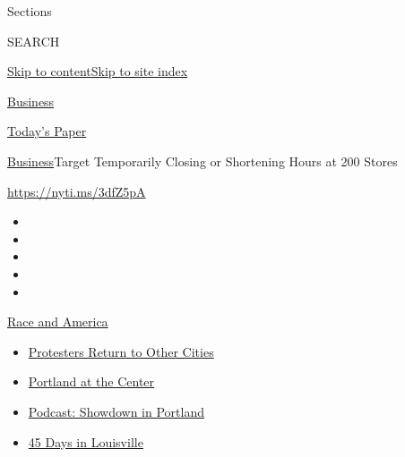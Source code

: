 Sections

SEARCH

\protect\hyperlink{site-content}{Skip to
content}\protect\hyperlink{site-index}{Skip to site index}

\href{https://www.nytimes.com/section/business}{Business}

\href{https://myaccount.nytimes.com/auth/login?response_type=cookie\&client_id=vi}{}

\href{https://www.nytimes.com/section/todayspaper}{Today's Paper}

\href{/section/business}{Business}\textbar{}Target Temporarily Closing
or Shortening Hours at 200 Stores

\url{https://nyti.ms/3dfZ5pA}

\begin{itemize}
\item
\item
\item
\item
\item
\end{itemize}

\href{https://www.nytimes.com/news-event/george-floyd-protests-minneapolis-new-york-los-angeles?action=click\&pgtype=Article\&state=default\&region=TOP_BANNER\&context=storylines_menu}{Race
and America}

\begin{itemize}
\tightlist
\item
  \href{https://www.nytimes.com/2020/07/26/us/protests-portland-seattle-trump.html?action=click\&pgtype=Article\&state=default\&region=TOP_BANNER\&context=storylines_menu}{Protesters
  Return to Other Cities}
\item
  \href{https://www.nytimes.com/2020/07/24/us/portland-oregon-protests-white-race.html?action=click\&pgtype=Article\&state=default\&region=TOP_BANNER\&context=storylines_menu}{Portland
  at the Center}
\item
  \href{https://www.nytimes.com/2020/07/23/podcasts/the-daily/portland-protests.html?action=click\&pgtype=Article\&state=default\&region=TOP_BANNER\&context=storylines_menu}{Podcast:
  Showdown in Portland}
\item
  \href{https://www.nytimes.com/interactive/2020/07/16/us/black-lives-matter-protests-louisville-breonna-taylor.html?action=click\&pgtype=Article\&state=default\&region=TOP_BANNER\&context=storylines_menu}{45
  Days in Louisville}
\end{itemize}

